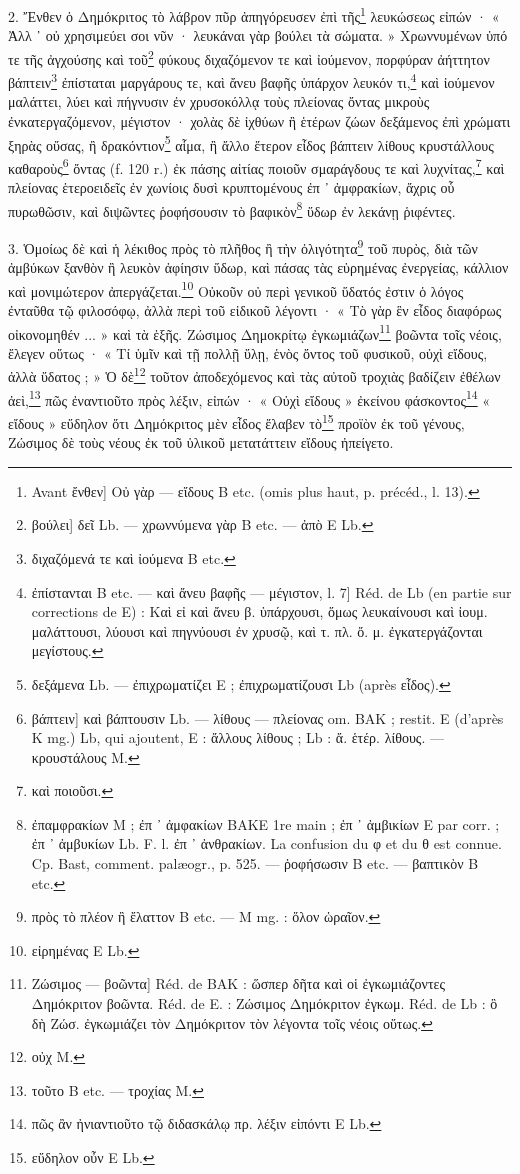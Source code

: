 \documentclass[a4paper, 11pt, oneside, polutonikogreek, french]{article}
\begin{document}
2. Ἔνθεν ὁ Δημόκριτος τὸ λάβρον πῦρ ἀπηγόρευσεν ἐπὶ τῆς\footnote{Avant ἔνθεν] Οὐ γὰρ --- εἴδους B etc. (omis plus haut, p. précéd., l. 13).} λευκώσεως εἰπών · « Ἀλλ ᾽ οὐ χρησιμεύει σοι νῦν · λευκάναι γὰρ βούλει τὰ σώματα. » Χρωννυμένων ὑπό τε τῆς ἀγχούσης καὶ τοῦ\footnote{βούλει] δεῖ Lb. --- χρωννύμενα γὰρ B etc. --- ἀπὸ E Lb.} φύκους διχαζόμενον τε καὶ ἰούμενον, πορφύραν ἀήττητον βάπτειν\footnote{διχαζόμενά τε καὶ ἰούμενα B etc.} ἐπίσταται μαργάρους τε, καὶ ἄνευ βαφῆς ὑπάρχον λευκόν τι,\footnote{ἐπίστανται B etc. --- καὶ ἄνευ βαφῆς --- μέγιστον, l. 7] Réd. de Lb (en partie sur corrections de E) : Καὶ εἰ καὶ ἄνευ β. ὑπάρχουσι, ὅμως λευκαίνουσι καὶ ἰουμ. μαλάττουσι, λύουσι καὶ πηγνύουσι ἐν χρυσῷ, καὶ τ. πλ. ὄ. μ. ἐγκατεργάζονται μεγίστους.} καὶ ἰούμενον μαλάττει, λύει καὶ πήγνυσιν ἐν χρυσοκόλλᾳ τοὺς πλείονας ὄντας μικροὺς ἐνκατεργαζόμενον, μέγιστον · χολὰς δὲ ἰχθύων ἢ ἑτέρων ζώων δεξάμενος ἐπὶ χρώματι ξηρὰς οὔσας, ἢ δρακόντιον\footnote{δεξάμενα Lb. --- ἐπιχρωματίζει E ; ἐπιχρωματίζουσι Lb (après εἶδος).} αἷμα, ἢ ἄλλο ἕτερον εἶδος βάπτειν λίθους κρυστάλλους καθαροὺς\footnote{βάπτειν] καὶ βάπτουσιν Lb. --- λίθους --- πλείονας om. BAK ; restit. E (d'après K mg.) Lb, qui ajoutent, E : ἄλλους λίθους ; Lb : ἄ. ἑτέρ. λίθους. --- κρουστάλους M.} ὄντας (f. 120 r.) ἐκ πάσης αἰτίας ποιοῦν σμαράγδους τε καὶ λυχνίτας,\footnote{καὶ ποιοῦσι.} καὶ πλείονας ἑτεροειδεῖς ἐν χωνίοις δυσὶ κρυπτομένους ἐπ ᾽ ἀμφρακίων, ἄχρις οὗ πυρωθῶσιν, καὶ διψῶντες ῥοφήσουσιν τὸ βαφικὸν\footnote{ἐπαμφρακίων M ; ἐπ ᾽ ἀμφακίων BAKE 1re main ; ἐπ ᾽ ἀμβικίων E par corr. ; ἐπ ᾽ ἀμβυκίων Lb. F. l. ἐπ ᾽ ἀνθρακίων. La confusion du φ et du θ est connue. Cp. Bast, comment. palæogr., p. 525. --- ῥοφήσωσιν B etc. --- βαπτικὸν B etc.} ὕδωρ ἐν λεκάνῃ ῥιφέντες.

3. Ὁμοίως δὲ καὶ ἡ λέκιθος πρὸς τὸ πλῆθος ἢ τὴν ὀλιγότητα\footnote{πρὸς τὸ πλέον ἢ ἔλαττον B etc. --- M mg. : ὅλον ὡραῖον.} τοῦ πυρὸς, διὰ τῶν ἀμβύκων ξανθὸν ἢ λευκὸν ἀφίησιν ὕδωρ, καὶ πάσας τὰς εὑρημένας ἐνεργείας, κάλλιον καὶ μονιμώτερον ἀπεργάζεται.\footnote{εἰρημένας E Lb.} Οὐκοῦν οὐ περὶ γενικοῦ ὕδατός ἐστιν ὁ λόγος ἐνταῦθα τῷ φιλοσόφῳ, ἀλλὰ περὶ τοῦ εἰδικοῦ λέγοντι · « Τὸ γὰρ ἓν εἶδος διαφόρως οἰκονομηθέν ... » καὶ τὰ ἑξῆς. Ζώσιμος Δημοκρίτῳ ἐγκωμιάζων\footnote{Zώσιμος --- βοῶντα] Réd. de BAK : ὥσπερ δῆτα καὶ οἱ ἐγκωμιάζοντες Δημόκριτον βοῶντα. Réd. de E. : Ζώσιμος Δημόκριτον ἐγκωμ. Réd. de Lb : ὃ δὴ Ζώσ. ἐγκωμιάζει τὸν Δημόκριτον τὸν λέγοντα τοῖς νέοις οὕτως.} βοῶντα τοῖς νέοις, ἔλεγεν οὕτως · « Τί ὑμῖν καὶ τῇ πολλῇ ὕλῃ, ἑνὸς ὄντος τοῦ φυσικοῦ, οὐχὶ εἴδους, ἀλλὰ ὕδατος ; » Ὁ δὲ\footnote{οὐχ M.} τοῦτον ἀποδεχόμενος καὶ τὰς αὐτοῦ τροχιὰς βαδίζειν ἐθέλων ἀεὶ,\footnote{τοῦτο B etc. --- τροχίας M.} πῶς ἐναντιοῦτο πρὸς λέξιν, εἰπών · « Οὐχὶ εἴδους » ἐκείνου φάσκοντος\footnote{πῶς ἂν ἠνιαντιοῦτο τῷ διδασκάλῳ πρ. λέξιν εἰπόντι E Lb.} « εἴδους » εὔδηλον ὅτι Δημόκριτος μὲν εἶδος ἔλαβεν τὸ\footnote{εὔδηλον οὖν E Lb.} προϊὸν ἐκ τοῦ γένους, Ζώσιμος δὲ τοὺς νέους ἐκ τοῦ ὑλικοῦ μετατάττειν εἴδους ἠπείγετο.
\end{document}

